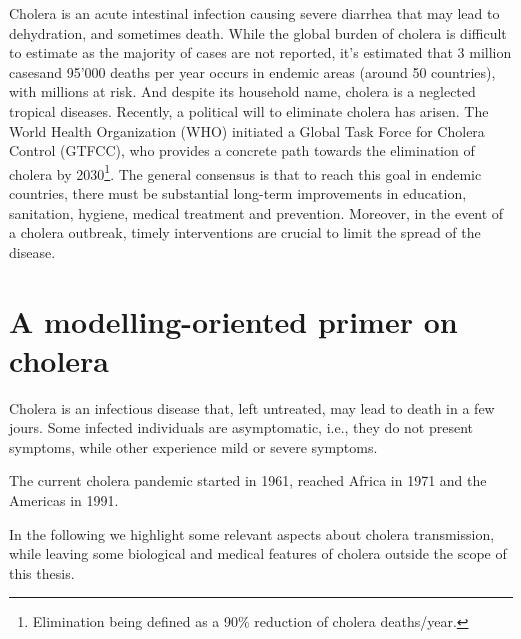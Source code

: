 Cholera is an acute intestinal infection causing severe diarrhea that may lead to dehydration, and sometimes death. While the global burden of cholera is difficult to estimate as the majority of cases are not reported, it's estimated that 3 million casesand 95'000 deaths per year occurs in endemic areas (around 50 countries)\cite{Ali:UpdatedGlobalBurden:2015}, with millions at risk. And despite its household name, cholera is a neglected tropical diseases.
Recently, a political will to eliminate cholera has arisen. The World Health Organization (WHO) initiated a Global Task Force for Cholera Control (GTFCC), who provides a concrete path towards the elimination of cholera by 2030\footnote{Elimination being defined as a 90\% reduction of cholera deaths/year.}. The general consensus is that to reach this goal in endemic countries, there must be substantial long-term improvements in education, sanitation, hygiene, medical treatment and prevention.  Moreover, in the event of a cholera outbreak, timely interventions are crucial to limit the spread of the disease. %

\section{A modelling-oriented primer on cholera} 

Cholera is an infectious disease that, left untreated, may lead to death in a few jours. Some infected individuals are asymptomatic, i.e., they do not present symptoms, while other experience mild or severe symptoms. %

The current cholera pandemic started in 1961, reached Africa in 1971 and the Americas in 1991\cite{Mutreja:EvidenceSeveralWaves:2011}. 

In the following we highlight some relevant aspects about cholera transmission, while leaving some biological and medical features of cholera outside the scope of this thesis. 

